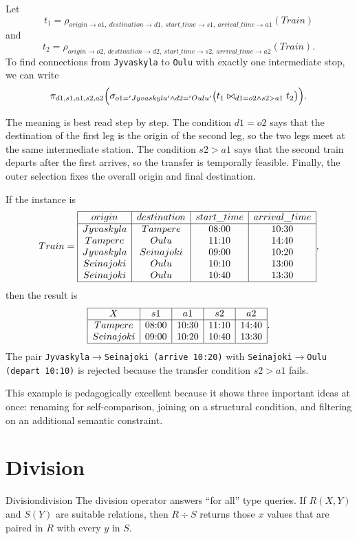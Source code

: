 \documentclass[11pt,a4paper,openany]{book}
\newcommand{\RAselect}{\sigma}
\newcommand{\RAproject}{\pi}
\newcommand{\RArename}{\rho}
\newcommand{\join}{\bowtie}
\begin{document}
Let
\[
t_1=\RArename_{origin\rightarrow o1,\ destination\rightarrow d1,\ start\_time\rightarrow s1,\ arrival\_time\rightarrow a1}(Train)
\]
and
\[
t_2=\RArename_{origin\rightarrow o2,\ destination\rightarrow d2,\ start\_time\rightarrow s2,\ arrival\_time\rightarrow a2}(Train).
\]
To find connections from \texttt{Jyvaskyla} to \texttt{Oulu} with exactly one intermediate stop, we can write
\[
\RAproject_{d1,s1,a1,s2,a2}\Bigl(
\RAselect_{o1='Jyvaskyla' \wedge d2='Oulu'}\bigl(
t_1 \join_{d1=o2 \wedge s2>a1} t_2
\bigr)\Bigr).
\]

The meaning is best read step by step. The condition \(d1=o2\) says that the destination of the first leg is the origin of the second leg, so the two legs meet at the same intermediate station. The condition \(s2>a1\) says that the second train departs after the first arrives, so the transfer is temporally feasible. Finally, the outer selection fixes the overall origin and final destination.

If the instance is
\[
Train=
\begin{array}{|c|c|c|c|}\hline
origin&destination&start\_time&arrival\_time\\\hline
Jyvaskyla&Tampere&08{:}00&10{:}30\\
Tampere&Oulu&11{:}10&14{:}40\\
Jyvaskyla&Seinajoki&09{:}00&10{:}20\\
Seinajoki&Oulu&10{:}10&13{:}00\\
Seinajoki&Oulu&10{:}40&13{:}30\\\hline
\end{array},
\]
then the result is
\[
\begin{array}{|c|c|c|c|c|}\hline
X&s1&a1&s2&a2\\\hline
Tampere&08{:}00&10{:}30&11{:}10&14{:}40\\
Seinajoki&09{:}00&10{:}20&10{:}40&13{:}30\\\hline
\end{array}.
\]
The pair \texttt{Jyvaskyla\(\to\)Seinajoki (arrive 10:20)} with \texttt{Seinajoki\(\to\)Oulu (depart 10:10)} is rejected because the transfer condition \(s2>a1\) fails.

This example is pedagogically excellent because it shows three important ideas at once: renaming for self-comparison, joining on a structural condition, and filtering on an additional semantic constraint.

\section{Division}
\begin{definition}{Division}{division}
The division operator answers ``for all'' type queries. If \(R(X,Y)\) and \(S(Y)\) are suitable relations, then \(R \div S\) returns those \(x\) values that are paired in \(R\) with every \(y\) in \(S\).
\end{definition}
\end{document}
